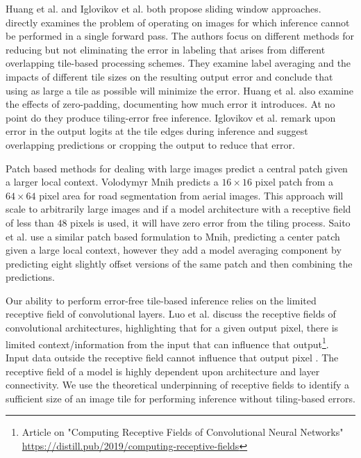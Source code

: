 \documentclass[twoside,11pt]{article}
\begin{document}
Huang et al. and Iglovikov et al. \citep{Huang2019a,Iglovikov2017} both propose sliding window approaches. \citep{Huang2019a} directly examines the problem of operating on images for which inference cannot be performed in a single forward pass. The authors focus on different methods for reducing but not eliminating the error in labeling that arises from different overlapping tile-based processing schemes. They examine label averaging and the impacts of different tile sizes on the resulting output error and conclude that using as large a tile as possible will minimize the error. Huang et al. \citep{Huang2019a} also examine the effects of zero-padding, documenting how much error it introduces. At no point do they produce tiling-error free inference. Iglovikov et al. \citep{Iglovikov2017} remark upon error in the output logits at the tile edges during inference and suggest overlapping predictions or cropping the output to reduce that error. 

Patch based methods for dealing with large images predict a central patch given a larger local context. Volodymyr Mnih \citep{Mnih2013} predicts a $16 \times 16$ pixel patch from a $64 \times 64$ pixel area for road segmentation from aerial images. This approach will scale to arbitrarily large images and if a model architecture with a receptive field of less than $48$ pixels is used, it will have zero error from the tiling process. Saito et al. \citep{Saito2016} use a similar patch based formulation to Mnih, predicting a center patch given a large local context, however they add a model averaging component by predicting eight slightly offset versions of the same patch and then combining the predictions.

Our ability to perform error-free tile-based inference relies on the limited receptive field of convolutional layers. Luo et al. \citep{Luo2016} discuss the receptive fields of convolutional architectures, highlighting that for a given output pixel, there is limited context/information from the input that can influence that output\footnote{Article on "Computing Receptive Fields of Convolutional Neural Networks" \citep{araujo2019computing} \url{https://distill.pub/2019/computing-receptive-fields}}. Input data outside the receptive field cannot influence that output pixel \citep{Luo2016}. The receptive field of a model is highly dependent upon architecture and layer connectivity. We use the theoretical underpinning of receptive fields to identify a sufficient size of an image tile for performing inference without tiling-based errors.  
\end{document}
